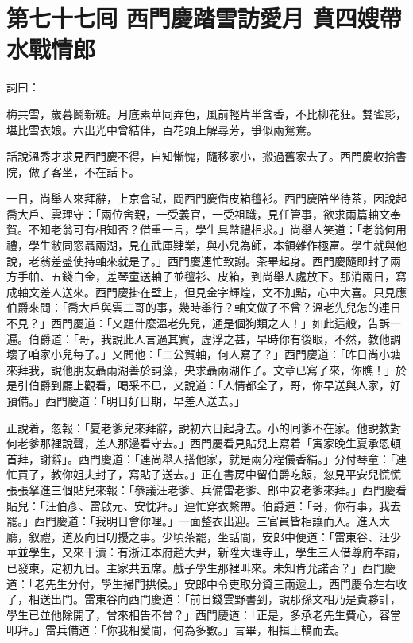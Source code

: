 
\chapter*{第七十七囘 西門慶踏雪訪愛月 賁四嫂帶水戰情郎}


詞曰：

\begin{myquote} 
梅共雪，歲暮鬬新粧。月底素華同弄色，風前輕片半含香，不比柳花狂。雙雀影，堪比雪衣娘。六出光中曾結伴，百花頭上解尋芳，爭似兩鴛鴦。

\end{myquote} 

話說溫秀才求見西門慶不得，自知慚愧，隨移家小，搬過舊家去了。西門慶收拾書院，做了客坐，不在話下。

一日，尚舉人來拜辭，上京會試，問西門慶借皮箱氊衫。西門慶陪坐待茶，因說起喬大戶、雲理守：「兩位舍親，一受義官，一受祖職，見任管事，欲求兩篇軸文奉賀。不知老翁可有相知否？借重一言，學生具幣禮相求。」尚舉人笑道：「老翁何用禮，學生敝同窓聶兩湖，見在武庫肄業，與小兒為師，本領雜作極富。學生就與他說，老翁差盛使持軸來就是了。」西門慶連忙致謝。茶畢起身。西門慶隨即封了兩方手帕、五錢白金，差琴童送軸子並氊衫、皮箱，到尚舉人處放下。那消兩日，寫成軸文差人送來。西門慶掛在壁上，但見金字輝煌，文不加點，心中大喜。只見應伯爵來問：「喬大戶與雲二哥的事，幾時舉行？軸文做了不曾？溫老先兒怎的連日不見？」西門慶道：「又題什麼溫老先兒，通是個狗類之人！」如此這般，告訴一遍。伯爵道：「哥，我說此人言過其實，虛浮之甚，早時你有後眼，不然，教他調壞了咱家小兒每了。」又問他：「二公賀軸，何人寫了？」西門慶道：「昨日尚小塘來拜我，說他朋友聶兩湖善於詞藻，央求聶兩湖作了。文章已寫了來，你瞧！」於是引伯爵到廳上觀看，喝采不已，又說道：「人情都全了，哥，你早送與人家，好預備。」西門慶道：「明日好日期，早差人送去。」

正說着，忽報：「夏老爹兒來拜辭，說初六日起身去。小的囘爹不在家。他說教對何老爹那裡說聲，差人那邊看守去。」西門慶看見貼兒上寫着「寅家晚生夏承恩頓首拜，謝辭」。西門慶道：「連尚舉人搭他家，就是兩分程儀香絹。」分付琴童：「連忙買了，教你姐夫封了，寫貼子送去。」正在書房中留伯爵吃飯，忽見平安兒慌慌張張拏進三個貼兒來報：「叅議汪老爹、兵備雷老爹、郎中安老爹來拜。」西門慶看貼兒：「汪伯彥、雷啟元、安忱拜。」連忙穿衣繫帶。伯爵道：「哥，你有事，我去罷。」西門慶道：「我明日會你哩。」一面整衣出迎。三官員皆相讓而入。進入大廳，叙禮，道及向日叨擾之事。少頃茶罷，坐話間，安郎中便道：「雷東谷、汪少華並學生，又來干瀆：有浙江本府趙大尹，新陞大理寺正，學生三人借尊府奉請，已發柬，定初九日。主家共五席。戲子學生那裡叫來。未知肯允諾否？」西門慶道：「老先生分付，學生掃門拱候。」{}安郎中令吏取分資三兩遞上，西門慶令左右收了，相送出門。雷東谷向西門慶道：「前日錢雲野書到，說那孫文相乃是貴夥計，學生已並他除開了，曾來相告不曾？」西門慶道：「正是，多承老先生費心，容當叩拜。」雷兵備道：「你我相愛間，何為多數。」言畢，相揖上轎而去。

